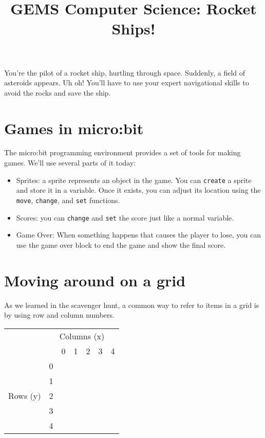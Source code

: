 \documentclass[11pt]{article}
\theoremstyle{definition}
\begin{document}
\title{GEMS Computer Science: Rocket Ships!}
\date{}
\maketitle

You're the pilot of a rocket ship, hurtling through space. Suddenly, a field of asteroids appears. Uh oh! You'll have to use your expert navigational skills to avoid the rocks and save the ship.

\section{Games in micro:bit}
The micro:bit programming environment provides a set of tools for making games. We'll use several parts of it today:
\begin{itemize}
  \item Sprites: a sprite represents an object in the game. You can \texttt{create} a sprite and store it in a variable. Once it exists, you can adjust its location using the \texttt{move}, \texttt{change}, and \texttt{set} functions.
  \item Scores: you can \texttt{change} and \texttt{set} the score just like a normal variable.
  \item Game Over: When something happens that causes the player to lose, you can use the game over block to end the game and show the final score.
\end{itemize}

\section{Moving around on a grid}
As we learned in the scavenger hunt, a common way to refer to items in a grid is by using row and column numbers.

\begin{center}
\begin{tabular}{*{7}{c|}}
\multicolumn{1}{c}{} & \multicolumn{6}{c}{Columns (x)} \\ 
\multicolumn{2}{c}{} & \multicolumn{1}{c}{0} & \multicolumn{1}{c}{1} & \multicolumn{1}{c}{2} & \multicolumn{1}{c}{3} & \multicolumn{1}{c}{4} 
\\ \cline{3-7}
\multirow{5}{*}{Rows (y)} & 0 & & & & & \\ \cline{3-7}
                      & 1 & & & & & \\ \cline{3-7}
                      & 2 & & & & & \\ \cline{3-7}
                      & 3 & & & & & \\ \cline{3-7}
                      & 4 & & & & & \\ \cline{3-7}
\end{tabular}
\end{center}
\end{document}
